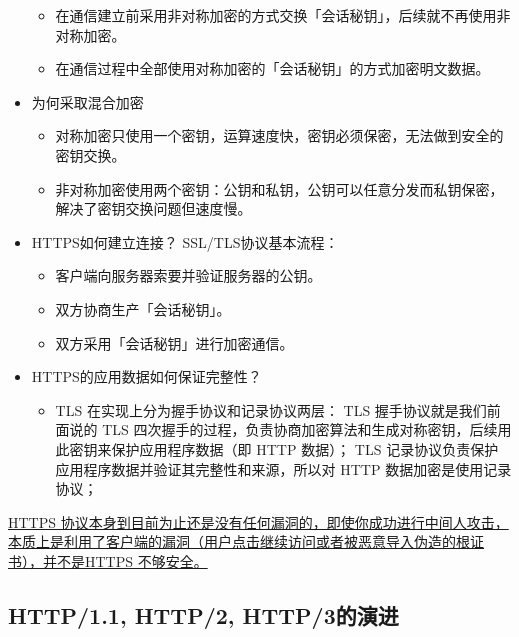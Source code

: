 \documentclass[11pt]{article}
\begin{document}
\begin{itemize}
\begin{itemize}
\item 在通信建立前采用非对称加密的方式交换「会话秘钥」，后续就不再使用非对称加密。
\item 在通信过程中全部使用对称加密的「会话秘钥」的方式加密明文数据。
\end{itemize}
\item 为何采取混合加密
\begin{itemize}
\item 对称加密只使用一个密钥，运算速度快，密钥必须保密，无法做到安全的密钥交换。
\item 非对称加密使用两个密钥：公钥和私钥，公钥可以任意分发而私钥保密，解决了密钥交换问题但速度慢。
\end{itemize}
\item HTTPS如何建立连接？
SSL/TLS协议基本流程：
\begin{itemize}
\item 客户端向服务器索要并验证服务器的公钥。
\item 双方协商生产「会话秘钥」。
\item 双方采用「会话秘钥」进行加密通信。
\end{itemize}
\item HTTPS的应用数据如何保证完整性？
\begin{itemize}
\item TLS 在实现上分为握手协议和记录协议两层：
TLS 握手协议就是我们前面说的 TLS 四次握手的过程，负责协商加密算法和生成对称密钥，后续用此密钥来保护应用程序数据（即 HTTP 数据）；
TLS 记录协议负责保护应用程序数据并验证其完整性和来源，所以对 HTTP 数据加密是使用记录协议；
\end{itemize}
\end{itemize}
\uline{HTTPS 协议本身到目前为止还是没有任何漏洞的，即使你成功进行中间人攻击，本质上是利用了客户端的漏洞（用户点击继续访问或者被恶意导入伪造的根证书），并不是HTTPS 不够安全。}
\subsection{HTTP/1.1, HTTP/2, HTTP/3的演进}
\label{sec:org6f6709b}
\end{document}
